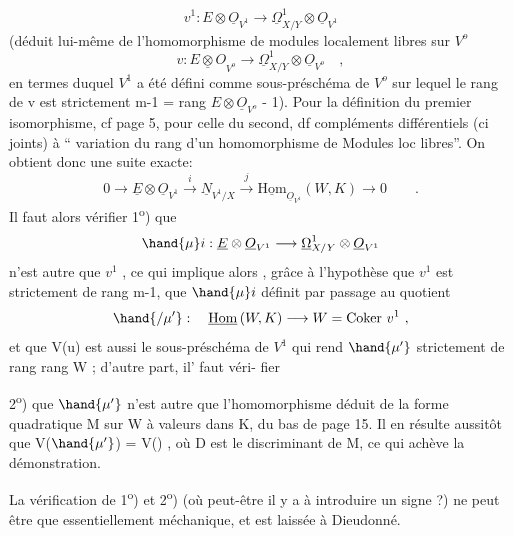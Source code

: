 
\[ v^1 : E\otimes\underline{O}_{V^1} \longrightarrow \underline{\Omega}^1_{X/Y}\otimes\underline{O}_{V^1} \]
 (déduit  lui-même de l'homomorphisme de modules
localement libres sur $V^o$
\[ v : \underline{E\otimes O}_{V^o} \longrightarrow \underline{\Omega}^1_{X/Y}\otimes \underline{O}_{V^o} \quad , \]
en termes duquel  $V^1$ a été défini comme sous-préschéma de $V^o$ sur lequel
le rang de v est strictement \hand{\unsure{$\leq$}} m-1 = rang $E\otimes\underline{O}_{V^o}$ - 1). Pour la définition
du premier isomorphisme, cf page 5, pour celle du second, df compléments
différentiels (ci joints) à `` variation du rang d'un homomorphisme de
Modules loc libres''. On obtient donc une suite exacte:
\[ 0 \to \underline{E}\otimes\underline{O}_{V^1} \xrightarrow{\ i\ } \underline{N}_{V^1/X} \xrightarrow{\ \ j\ \ } \underline{\mathrm{Hom}}_{\underline{O}_{V^1}}(W,K) \longrightarrow 0 \qquad . \]
Il faut alors vérifier 
1\textsuperscript{o}) que
\[ \hand{\mu}i : \underline{E}\otimes\underline{O}_{V^1} \longrightarrow \underline{\Omega}^1_{X/Y}\otimes\underline{O}_{V^1} \]
n'est autre que $v^1$ , ce qui implique alors , grâce à l'hypothèse que
$v^1$ est strictement de rang m-1, que  $\hand{\mu}i$ définit par passage au
quotient
\[ \hand{/\mu'} : \quad \underline{\mathrm{Hom}}\,(W,K) \longrightarrow W = \mathrm{Coker}\ v^1 \ , \]
et que V(u) est aussi le sous-préschéma de $V^1$ qui rend $\hand{\mu'}$ strictement
de rang \hand{\unsure{$\leq$}}rang W  ; d'autre part, il'  faut véri-%
fier

2\textsuperscript{o}) que $\hand{\mu'}$ n'est autre que l'homomorphisme déduit de la forme
quadratique  M sur W à valeurs dans K, du bas de page 15. Il en résulte
aussitôt que V($\hand{\mu'}$) = V() , où D est le discriminant de M, ce  qui
achève la démonstration.

La vérification de 1\textsuperscript{o}) et 2\textsuperscript{o}) (où peut-être il y a à introduire un
signe ?) ne peut être que essentiellement méchanique, et est laissée à
Dieudonné.

